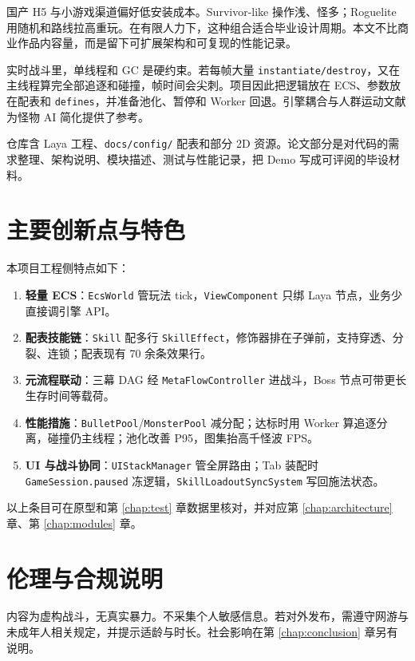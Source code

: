 \documentclass[UTF8,a4paper]{ctexart}
\begin{document}
国产 H5 与小游戏渠道偏好低安装成本。Survivor-like 操作浅、怪多；Roguelite 用随机和路线拉高重玩。在有限人力下，这种组合适合毕业设计周期。本文不比商业作品内容量，而是留下可扩展架构和可复现的性能记录。

实时战斗里，单线程和 GC 是硬约束。若每帧大量 \texttt{instantiate/destroy}，又在主线程算完全部追逐和碰撞，帧时间会尖刺。项目因此把逻辑放在 ECS、参数放在配表和 \texttt{defines}，并准备池化、暂停和 Worker 回退。引擎耦合与人群运动文献为怪物 AI 简化提供了参考\cite{ullmann2025sydra,gregory2018game,baabad2020degradation,cantrell2018unity,helbing2000panic,reynolds1987flocks}。

仓库含 Laya 工程、\texttt{docs/config/} 配表和部分 2D 资源。论文部分是对代码的需求整理、架构说明、模块描述、测试与性能记录，把 Demo 写成可评阅的毕设材料。

\section{主要创新点与特色}

本项目工程侧特点如下：
\begin{enumerate}[label=(\arabic*)]
  \item \textbf{轻量 ECS}：\texttt{EcsWorld} 管玩法 tick，\texttt{ViewComponent} 只绑 Laya 节点，业务少直接调引擎 API。
  \item \textbf{配表技能链}：\texttt{Skill} 配多行 \texttt{SkillEffect}，修饰器排在子弹前，支持穿透、分裂、连锁；配表现有 70 余条效果行。
  \item \textbf{元流程联动}：三幕 DAG 经 \texttt{MetaFlowController} 进战斗，Boss 节点可带更长生存时间等载荷。
  \item \textbf{性能措施}：\texttt{BulletPool}/\texttt{MonsterPool} 减分配；达标时用 Worker 算追逐分离，碰撞仍主线程；池化改善 P95，图集抬高千怪波 FPS。
  \item \textbf{UI 与战斗协同}：\texttt{UIStackManager} 管全屏路由；Tab 装配时 \texttt{GameSession.paused} 冻逻辑，\texttt{SkillLoadoutSyncSystem} 写回施法状态。
\end{enumerate}

以上条目可在原型和第 \ref{chap:test} 章数据里核对，并对应第 \ref{chap:architecture} 章、第 \ref{chap:modules} 章。

\section{伦理与合规说明}

内容为虚构战斗，无真实暴力。不采集个人敏感信息。若对外发布，需遵守网游与未成年人相关规定，并提示适龄与时长\cite{petty2010vv}。社会影响在第 \ref{chap:conclusion} 章另有说明。
\end{document}
